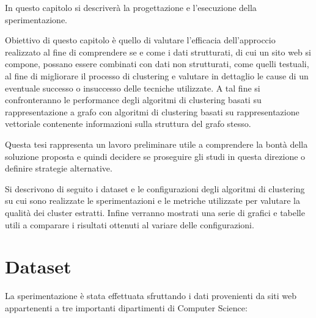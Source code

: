 

In questo capitolo si descriverà la progettazione e l’esecuzione della sperimentazione. 

Obiettivo di questo capitolo è quello di valutare l’efficacia dell'approccio realizzato al fine di comprendere se e come i dati strutturati, di cui un sito web si compone,  possano essere combinati con dati non strutturati, come quelli testuali, al fine di migliorare il processo di clustering e valutare in dettaglio le cause di un eventuale successo o insuccesso delle tecniche utilizzate.
A tal fine si confronteranno le performance degli algoritmi di clustering basati su rappresentazione a grafo con algoritmi di clustering basati su rappresentazione vettoriale contenente informazioni sulla struttura del grafo stesso.
 
Questa tesi rappresenta un lavoro preliminare utile a comprendere la bontà della soluzione proposta e quindi decidere se proseguire gli studi in questa direzione o definire strategie alternative.

Si descrivono di seguito i dataset e le configurazioni degli algoritmi di clustering su cui sono realizzate le sperimentazioni e le metriche utilizzate per valutare la qualità dei cluster estratti. Infine verranno mostrati una serie di grafici e tabelle utili a comparare i risultati ottenuti al variare delle configurazioni.

\section{Dataset}
La sperimentazione è stata effettuata sfruttando i dati provenienti da siti web appartenenti a tre importanti dipartimenti di Computer Science:

